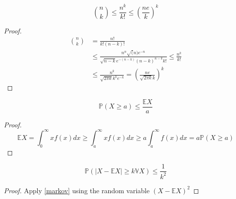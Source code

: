 \begin{corollary}\label{th:NChooseK}
	\begin{equation}
		\binom{n}{k} \leq \frac{n^k}{k!} \leq (\frac{ne}{k})^k
	\end{equation}
\end{corollary}
\begin{proof}
	\begin{align}
		\binom{n}{k} 	&= \frac{n!}{k!(n-k)!}  \\
				&\leq \frac{n^n\sqrt(n) e^{-n} }{\sqrt{n-k} e^{-(n-k)} (n-k)^{n-k} k!} \leq \frac{n^k}{k!} \\
				&\leq \frac{ n^k }{\sqrt{2\pi k} k^k e^{-k}} = (\frac{ne}{\sqrt{2\pi k} k})^k
	\end{align}
\end{proof}
	\begin{theorem}\label{markov}
	\begin{equation}
		\mathbb{P}(X \geq a) \leq \frac{\mathbb{E}X}{a}
	\end{equation}
\end{theorem}
\begin{proof}
    \begin{equation}
        \mathbb{E}X = \int_0^{\infty}x f(x)dx \geq \int_a^{\infty} xf(x)dx \geq  a\int_a^{\infty} f(x)dx =a \mathbb{P}(X\geq a)
    \end{equation}
\end{proof}


\begin{corollary}\label{cheby}
	\begin{equation}
		\mathbb{P}(|X - \mathbb{E}X| \geq k \mathbb{V}X ) \leq \frac{1}{k^2}
	\end{equation}
\end{corollary}
\begin{proof}
    Apply \eqref{markov} using the random variable $(X-\mathbb{E}X)^2$
\end{proof}
